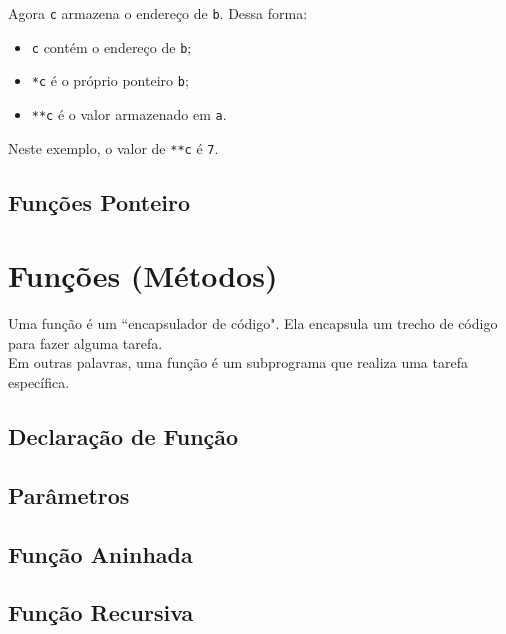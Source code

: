 \documentclass{article}
\begin{document}
Agora \texttt{c} armazena o endereço de \texttt{b}. Dessa forma:

\begin{itemize}
    \item \texttt{c} contém o endereço de \texttt{b};
    \item \texttt{*c} é o próprio ponteiro \texttt{b};
    \item \texttt{**c} é o valor armazenado em \texttt{a}.
\end{itemize}

Neste exemplo, o valor de \texttt{**c} é \texttt{7}.

\subsection{Funções Ponteiro}

\section{Funções (Métodos)}
Uma função é um ``encapsulador de código". Ela encapsula um trecho de código para fazer alguma tarefa.
\\[3pt]
Em outras palavras, uma função é um subprograma que realiza uma tarefa específica.

\subsection{Declaração de Função}

\subsection{Parâmetros}

\subsection{Função Aninhada}

\subsection{Função Recursiva}
\end{document}
